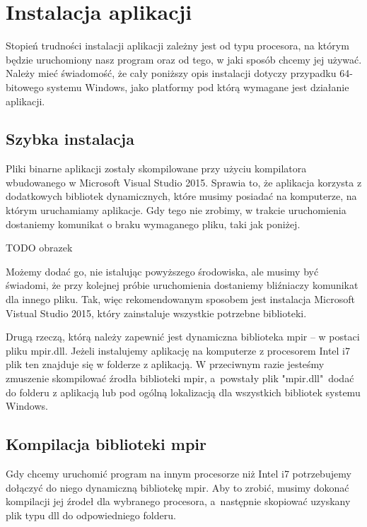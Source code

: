 \section{Instalacja aplikacji}

Stopień trudności instalacji aplikacji zależny jest od typu procesora, na którym będzie uruchomiony nasz program oraz od tego, w jaki sposób chcemy jej używać. Należy mieć świadomość, że cały poniższy opis instalacji dotyczy przypadku 64-bitowego systemu Windows, jako platformy pod którą wymagane jest działanie aplikacji.

\subsection{Szybka instalacja}

Pliki binarne aplikacji zostały skompilowane przy użyciu kompilatora wbudowanego w Microsoft Visual Studio 2015. Sprawia to, że aplikacja korzysta z dodatkowych bibliotek dynamicznych, które musimy posiadać na komputerze, na którym uruchamiamy aplikacje. Gdy tego nie zrobimy, w trakcie uruchomienia dostaniemy komunikat o braku wymaganego pliku, taki jak poniżej.

TODO obrazek

Możemy dodać go, nie istalując powyższego środowiska, ale musimy być świadomi, że przy kolejnej próbie uruchomienia dostaniemy bliźniaczy komunikat dla innego pliku. Tak, więc rekomendowanym sposobem jest instalacja Microsoft Vistual Studio 2015, który zainstaluje wszystkie potrzebne biblioteki.

Drugą rzeczą, którą należy zapewnić jest dynamiczna biblioteka mpir -- w postaci pliku mpir.dll. Jeżeli instalujemy aplikację na komputerze z procesorem Intel i7 plik ten znajduje się w folderze z aplikacją. W przeciwnym razie jesteśmy zmuszenie skompilować źrodła biblioteki mpir, a~powstały plik "mpir.dll"\ dodać do folderu z aplikacją lub pod ogólną lokalizacją dla wszystkich bibliotek systemu Windows.

\subsection{Kompilacja biblioteki mpir}

Gdy chcemy uruchomić program na innym procesorze niż Intel i7 potrzebujemy dołączyć do niego dynamiczną bibliotekę mpir. Aby to zrobić, musimy dokonać kompilacji jej źrodeł dla wybranego procesora, a~następnie skopiować uzyskany plik typu dll do odpowiedniego folderu.

